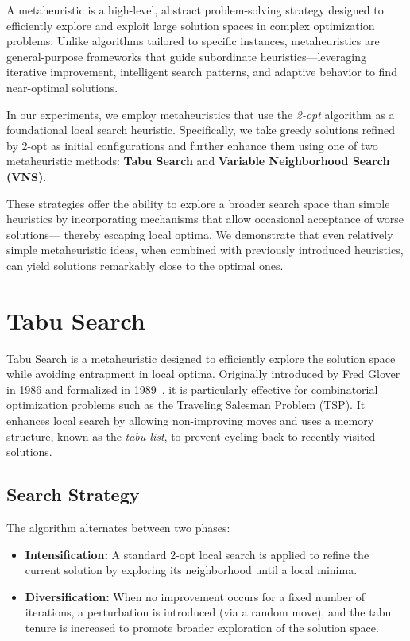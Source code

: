 A metaheuristic is a high-level, abstract problem-solving strategy designed to efficiently explore and exploit large solution spaces 
in complex optimization problems. Unlike algorithms tailored to specific instances, metaheuristics are general-purpose frameworks 
that guide subordinate heuristics—leveraging iterative improvement, intelligent search patterns, and adaptive behavior to find near-optimal solutions.

In our experiments, we employ metaheuristics that use the \textit{2-opt} algorithm as a foundational local search heuristic. 
Specifically, we take greedy solutions refined by 2-opt as initial configurations and further enhance them using one of two metaheuristic methods: 
\textbf{Tabu Search} and \textbf{Variable Neighborhood Search (VNS)}.

These strategies offer the ability to explore a broader search space than simple heuristics by incorporating mechanisms that allow 
occasional acceptance of worse solutions— thereby escaping local optima. We demonstrate that even relatively simple metaheuristic ideas, 
when combined with previously introduced heuristics, can yield solutions remarkably close to the optimal ones.

\section{Tabu Search}

Tabu Search is a metaheuristic designed to efficiently explore the solution space while avoiding entrapment in local optima. Originally introduced by Fred Glover in 1986 and formalized in 1989~\cite{Glover:TabuSearch}, it is particularly effective for combinatorial optimization problems such as the Traveling Salesman Problem (TSP). It enhances local search by allowing non-improving moves and uses a memory structure, known as the \textit{tabu list}, to prevent cycling back to recently visited solutions.

\subsection{Search Strategy}

The algorithm alternates between two phases:

\begin{itemize}
    \item \textbf{Intensification:} A standard 2-opt local search is applied to refine the current solution by exploring its neighborhood until a local minima.
    \item \textbf{Diversification:} When no improvement occurs for a fixed number of iterations, a perturbation is introduced (via a random move), and the tabu tenure is increased to promote broader exploration of the solution space.
\end{itemize}


